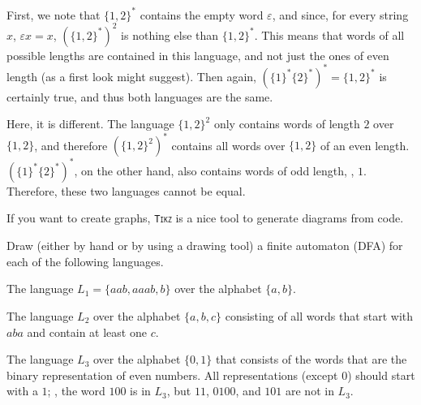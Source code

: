 \documentclass{exercise}
\begin{document}
  \enlargethispage{1.5cm}
  \begin{solution}
    \begin{taskitems}
      \item First, we note that $\{1,2\}^*$ contains the empty word $\varepsilon$, and since,
        for every string $x$, $\varepsilon x=x$, $(\{1,2\}^*)^2$ is nothing else than $\{1,2\}^*$.
        This means that words of all possible lengths are contained in this language, and not
        just the ones of even length (as a first look might suggest).  Then again,
        $(\{1\}^*\{2\}^*)^*=\{1,2\}^*$ is certainly true, and thus both languages are the same.
      \item Here, it is different.  The language $\{1,2\}^2$ only contains words of length $2$ over
        $\{1,2\}$, and therefore $(\{1,2\}^2)^*$ contains all words over $\{1,2\}$ of an
        even length.  $(\{1\}^*\{2\}^*)^*$, on the other hand, also contains words of odd length,
        \eg, $1$.  Therefore, these two languages cannot be equal.
    \end{taskitems}
  \end{solution}


If you want to create graphs, \texttt{\textsc{Tikz}} is a nice tool to generate diagrams
from code.

\subtask Draw (either by hand or by using a drawing tool) a finite
  automaton (DFA) for each of the following languages.
  \begin{taskitems}
    \item The language $L_1=\{aab,aaab,b\}$ over the alphabet $\{a,b\}$.
    \item The language $L_2$ over the alphabet $\{a,b,c\}$ consisting of all words that start with
      $aba$ and contain at least one $c$.
    \item The language $L_3$ over the alphabet $\{0,1\}$ that consists of the words that are the binary
      representation of even numbers.  All representations (except $0$) should start with a $1$; \eg,
			the word $100$ is in $L_3$, but $11$, $0100$, and $101$ are not in $L_3$.
  \end{taskitems}
\end{document}
